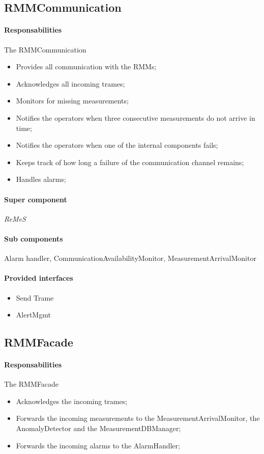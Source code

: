 \documentclass[a4paper,10pt]{article}
\newcommand{\rem}{\emph{ReMeS}\xspace}
\begin{document}
\subsection{RMMCommunication}
\paragraph{Responsabilities} 
The RMMCommunication
\begin{itemize}
	\item Provides all communication with the RMMs;
    \item Acknowledges all incoming trames;
    \item Monitors for missing measurements;
    \item Notifies the operators when three consecutive measurements do not arrive in time;
    \item Notifies the operators when one of the internal components fails;
    \item Keeps track of how long a failure of the communication channel remains;
    \item Handles alarms;
\end{itemize}

\paragraph{Super component} \rem

\paragraph{Sub components} Alarm handler, CommunicationAvailabilityMonitor, MeasurementArrivalMonitor

\paragraph{Provided interfaces}
\begin{itemize}
    \item Send Trame
    \item AlertMgmt
\end{itemize}

\subsection{RMMFacade}
\paragraph{Responsabilities} 
The RMMFacade
\begin{itemize}
	\item Acknowledges the incoming trames;
    \item Forwards the incoming measurements to the MeasurementArrivalMonitor, the AnomalyDetector and the MeasurementDBManager;
    \item Forwards the incoming alarms to the AlarmHandler;
\end{itemize}
\end{document}
